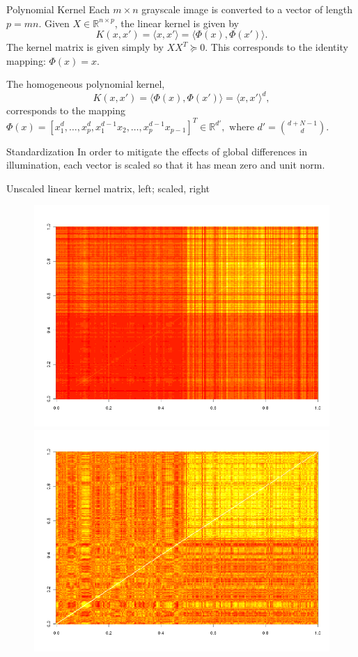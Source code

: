 \documentclass{beamer}
\begin{document}
\begin{frame}{Polynomial Kernel}
  Each $m \times n$ grayscale image is converted to a vector of
  length $p=mn$.  \pause
  Given $X \in \mathbb{R}^{n \times p}$, the linear kernel is given by
  $$
  K(x, x') = \langle x, x'\rangle = \langle \Phi(x), \Phi(x')\rangle.
  $$
  The kernel matrix is given simply by $XX^T  \succeq 0$.  This
  corresponds to the identity mapping: $\Phi(x) = x$. \pause

  The homogeneous polynomial kernel,
  $$
  K(x, x') = \langle \Phi(x), \Phi(x')\rangle = \langle x, x' \rangle^d, 
  $$
  corresponds to the mapping $\Phi(x) = [x_1^d, \ldots, x_p^d,
  x_1^{d-1}x_2, \ldots, x_p^{d-1}x_{p-1}]^T \in \mathbb{R}^{d'},
  \text{ where } d'=\binom{d+N-1}{d}$.
\end{frame}

\begin{frame}{Standardization}
  In order to mitigate the effects of global differences
  in illumination, each vector is scaled so that it has mean zero and
  unit norm.  \pause

  Unscaled linear kernel matrix, left; scaled, right
  \begin{figure}
    \centering
    \includegraphics[scale=.2]{car-plane-unscaled-1.png}
    \includegraphics[scale=.2]{car-plane-scaled-1.png}
  \end{figure}
\end{frame}
\end{document}
